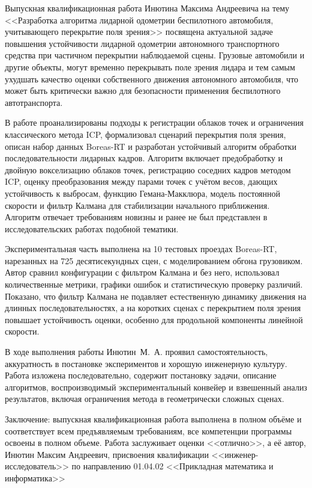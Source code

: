 \documentclass[master, fontsize=12pt]{diploma}
\begin{document}
\fillReviewHeader

Выпускная квалификационная работа Инютина Максима Андреевича на тему <<Разработка алгоритма лидарной одометрии беспилотного автомобиля, учитывающего перекрытие поля зрения>> посвящена актуальной задаче повышения устойчивости лидарной одометрии автономного транспортного средства при частичном перекрытии наблюдаемой сцены. Грузовые автомобили и другие объекты, могут временно перекрывать поле зрения лидара и тем самым ухудшать качество оценки собственного движения автономного автомобиля, что может быть критически важно для безопасности применения беспилотного автотранспорта.

В работе проанализированы подходы к регистрации облаков точек и ограничения классического метода ICP, формализовал сценарий перекрытия поля зрения, описан набор данных Boreas-RT и разработан устойчивый алгоритм обработки последовательности лидарных кадров. Алгоритм включает предобработку и двойную вокселизацию облаков точек, регистрацию соседних кадров методом ICP, оценку преобразования между парами точек с учётом весов, дающих устойчивость к выбросам, функцию Гемана-Макклюра, модель постоянной скорости и фильтр Калмана для стабилизации начального приближения. Алгоритм отвечает требованиям новизны и ранее не был представлен в исследовательских работах подобной тематики.

Экспериментальная часть выполнена на 10 тестовых проездах Boreas-RT, нарезанных на 725 десятисекундных сцен, с моделированием обгона грузовиком. Автор сравнил конфигурации с фильтром Калмана и без него, использовал количественные метрики, графики ошибок и статистическую проверку различий. Показано, что фильтр Калмана не подавляет естественную динамику движения на длинных последовательностях, а на коротких сценах с перекрытием поля зрения повышает устойчивость оценки, особенно для продольной компоненты линейной скорости.

В ходе выполнения работы Инютин~М.~А. проявил самостоятельность, аккуратность в постановке экспериментов и хорошую инженерную культуру. Работа изложена последовательно, содержит постановку задачи, описание алгоритмов, воспроизводимый экспериментальный конвейер и взвешенный анализ результатов, включая ограничения метода в геометрически сложных сценах.

\makeSimilarityLine

Заключение: выпускная квалификационная работа выполнена в полном объёме и соответствует всем предъявляемым требованиям, все компетенции программы освоены в полном объеме. Работа заслуживает оценки <<отлично>>, а её автор, Инютин Максим Андреевич, присвоения квалификации <<инженер-исследователь>> по направлению 01.04.02 <<Прикладная математика и информатика>>

\makeReviewSignature
\end{document}
